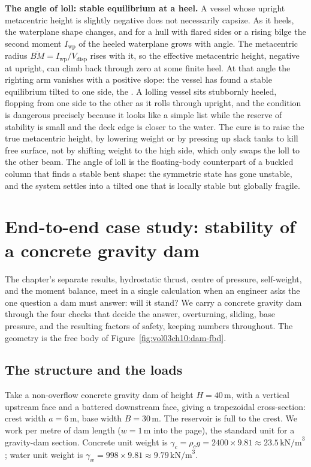 \begin{mastery}
\textbf{The angle of loll: stable equilibrium at a heel.} A vessel whose
upright metacentric height is slightly negative does not necessarily
capsize. As it heels, the waterplane shape changes, and for a hull with
flared sides or a rising bilge the second moment $I_{\text{wp}}$ of the
heeled waterplane grows with angle. The metacentric radius
$\overline{BM} = I_{\text{wp}}/V_{\text{disp}}$ rises with it, so the
effective metacentric height, negative at upright, can climb back through
zero at some finite heel. At that angle the righting arm vanishes with a
positive slope: the vessel has found a stable equilibrium tilted to one
side, the . A lolling vessel sits stubbornly heeled,
flopping from one side to the other as it rolls through upright, and the
condition is dangerous precisely because it looks like a simple list while
the reserve of stability is small and the deck edge is closer to the water.
The cure is to raise the true metacentric height, by lowering weight or by
pressing up slack tanks to kill free surface, not by shifting weight to the
high side, which only swaps the loll to the other beam. The angle of loll
is the floating-body counterpart of a buckled column that finds a stable
bent shape: the symmetric state has gone unstable, and the system settles
into a tilted one that is locally stable but globally fragile.
\end{mastery}

\section{End-to-end case study: stability of a concrete gravity dam}

The chapter's separate results, hydrostatic thrust, centre of pressure,
self-weight, and the moment balance, meet in a single calculation when an
engineer asks the one question a dam must answer: will it stand? We carry
a concrete gravity dam through the four checks that decide the answer,
overturning, sliding, base pressure, and the resulting factors of safety,
keeping numbers throughout. The geometry is the free body of
Figure~\ref{fig:vol03ch10:dam-fbd}.

\subsection{The structure and the loads}

Take a non-overflow concrete gravity dam of height $H = 40\,\si{\meter}$,
with a vertical upstream face and a battered downstream face, giving a
trapezoidal cross-section: crest width $a = 6\,\si{\meter}$, base width
$B = 30\,\si{\meter}$. The reservoir is full to the crest. We work per
metre of dam length ($w = 1\,\si{\meter}$ into the page), the standard
unit for a gravity-dam section. Concrete unit weight is $\gamma_c =
\rho_c g = 2400 \times 9.81 \approx 23.5\,\text{kN/m}^3$; water unit
weight is $\gamma_w = 998 \times 9.81 \approx 9.79\,\text{kN/m}^3$.

